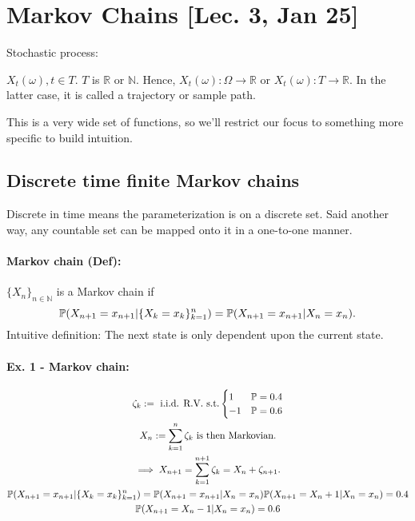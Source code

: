 \section{Markov Chains [Lec. 3, Jan 25]}

Stochastic process:

$X_t(\omega), t\in T$. $T$ is $\mathbb{R}$ or $\mathbb{N}$. Hence, $X_t(\omega): \Omega \to \mathbb{R}$ or $X_t(\omega): T\to \mathbb{R}$. In the latter case, it is called a trajectory or sample path. 

This is a very wide set of functions, so we'll restrict our focus to something more specific to build intuition. 

\subsection{Discrete time finite Markov chains}

Discrete in time means the parameterization is on a discrete set. Said another way, any countable set can be mapped onto it in a one-to-one manner. 

\paragraph*{Markov chain (Def): }$\{X_n\}_{n\in\mathbb{N}}$ is a Markov chain if 
\[
	\mathbb{P}( X_{n+1} = x_{n+1}| \{X_k = x_k\}_{k=1}^n) =  \mathbb{P} ( X_{n+1} = x_{n+1} | X_n = x_n ).
\]
Intuitive definition: The next state is only dependent upon the current state. 

\paragraph*{Ex. 1 - Markov chain: } 
\begin{gather*}
	\zeta_k := \text{ i.i.d. R.V. s.t.}
		\begin{cases}
			1 & \mathbb{P} = 0.4 \\
			-1 & \mathbb{P} = 0.6 
		\end{cases} \\
	X_n := \sum\limits_{k=1}^n \zeta_k \text{ is then Markovian.} \\
	\implies X_{n+1} = \sum\limits_{k=1}^{n+1} \zeta_k = X_n + \zeta_{n+1}. \\
	\mathbb{P}( X_{n + 1} = x_{n + 1}| \{ X_k = x_k\}_{k=1}^n )
		= \mathbb{P}(  X_{n + 1} = x_{n + 1}| X_n = x_n ) 
	\mathbb{P}( X_{n+1} = X_n + 1 | X_n = x_n) = 0.4 \\
	\mathbb{P}( X_{n+1} = X_n - 1 | X_n = x_n) = 0.6 \\	
\end{gather*}

